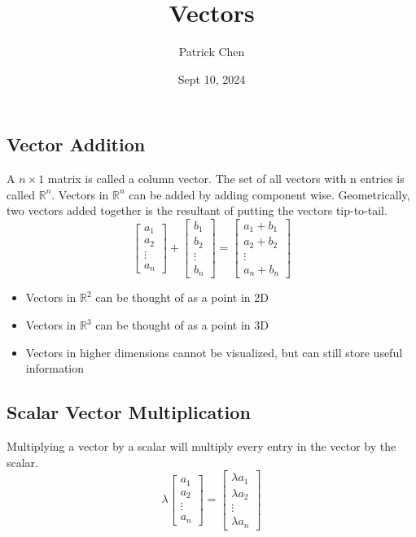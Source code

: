 \documentclass{article}
\title{Vectors}
\author{Patrick Chen}
\date{Sept 10, 2024}
\theoremstyle{mytheoremstyle}
\theoremstyle{mytheoremstyle}
\theoremstyle{myproblemstyle}
\begin{document}
    \maketitle
    \subsection*{Vector Addition}
    A $n\times 1$ matrix is called a column vector. The set of all vectors with
    n entries is called $\mathbb{R}^n$. Vectors in $\mathbb{R}^n$ can be added
    by adding component wise. Geometrically, two vectors added together is the
    resultant of putting the vectors tip-to-tail.
    \begin{equation*}
        \begin{bmatrix}
            a_1 \\ a_2 \\ \vdots \\ a_n
        \end{bmatrix} +
        \begin{bmatrix}
            b_1 \\ b_2 \\ \vdots \\ b_n
        \end{bmatrix} =
        \begin{bmatrix}
            a_1 + b_1 \\ a_2 + b_2 \\ \vdots \\ a_n + b_n
        \end{bmatrix}
    \end{equation*}

    \begin{itemize}
        \item Vectors in $\mathbb{R}^2$ can be thought of as a point in 2D
        \item Vectors in $\mathbb{R}^3$ can be thought of as a point in 3D
        \item Vectors in higher dimensions cannot be visualized, but can still
            store useful information
    \end{itemize}

    \subsection*{Scalar Vector Multiplication}
    Multiplying a vector by a scalar will multiply every entry in the vector by
    the scalar.
    \begin{equation*}
        \lambda
        \begin{bmatrix}
            a_1 \\ a_2 \\ \vdots \\ a_n
        \end{bmatrix} = 
        \begin{bmatrix}
            \lambda a_1 \\ \lambda a_2 \\ \vdots \\ \lambda a_n
        \end{bmatrix}
    \end{equation*}
\end{document}
